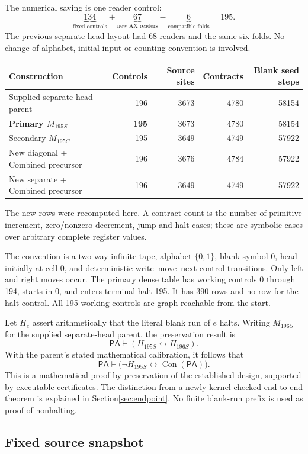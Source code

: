 \documentclass[11pt,a4paper]{article}
\newcommand{\PA}{\mathsf{PA}}
\newcommand{\Con}{\operatorname{Con}}
\begin{document}
The numerical saving is one reader control:
\[
\underbrace{134}_{\text{fixed controls}}+
\underbrace{67}_{\text{new AX readers}}-
\underbrace{6}_{\text{compatible folds}}=\boxed{195}.
\]
The previous separate-head layout had 68 readers and the same six folds.
No change of alphabet, initial input or counting convention is involved.

\begin{center}
\begin{tabular}{@{}lrrrr@{}}
\toprule
Construction & Controls & Source sites & Contracts & Blank seed steps\\
\midrule
Supplied separate-head parent &196&3673&4780&58154\\
\textbf{Primary $M_{195S}$} &\textbf{195}&3673&4780&58154\\
Secondary $M_{195C}$ &195&3649&4749&57922\\
New diagonal + Combined precursor &196&3676&4784&57922\\
New separate + Combined precursor &196&3649&4749&57922\\
\bottomrule
\end{tabular}
\end{center}
The new rows were recomputed here. A contract count is the number of
primitive increment, zero/nonzero decrement, jump and halt cases;
these are symbolic cases over arbitrary complete register values.

The convention is a two-way-infinite tape, alphabet $\{0,1\}$,
blank symbol 0, head initially at cell 0, and deterministic
write--move--next-control transitions. Only left and right moves occur.
The primary dense table has working controls 0 through 194, starts in 0,
and enters terminal halt 195. It has 390 rows and no row for the halt
control. All 195 working controls are graph-reachable from the start.

Let $H_e$ assert arithmetically that the literal blank run of $e$ halts.
Writing $M_{196S}$ for the supplied separate-head parent, the preservation
result is
\[
 \PA\vdash(H_{195S}\leftrightarrow H_{196S}).
\]
With the parent's stated mathematical calibration, it follows that
\[
 \boxed{\PA\vdash\bigl(\neg H_{195S}\leftrightarrow\Con(\PA)\bigr).}
\]
This is a mathematical proof by preservation of the established design,
supported by executable certificates. The distinction from a newly
kernel-checked end-to-end theorem is explained in
Section\ref{sec:endpoint}. No finite blank-run prefix is used as proof
of nonhalting.

\subsection{Fixed source snapshot}
\end{document}
